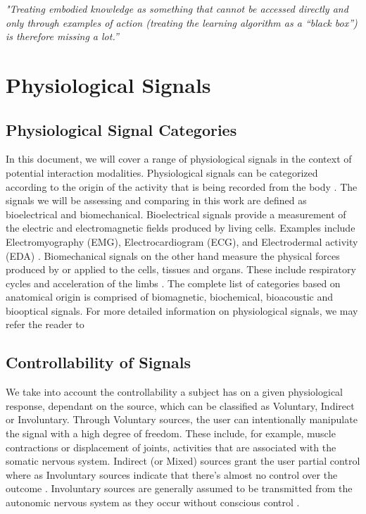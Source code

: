 \textit{"Treating embodied knowledge as something that cannot be accessed directly and only through examples of action (treating the learning algorithm as a “black box”) is therefore missing a lot.” }

\citeauthor{gillies_understanding_2019} \cite{gillies_understanding_2019}


\section{Physiological Signals}

\subsection{Physiological Signal Categories}
\label{subsec:catagories}

In this document, we will cover a range of physiological signals in the context of potential interaction modalities. Physiological signals can be categorized according to the origin of the activity that is being recorded from the body \cite{enderle_introduction_2012}. The signals we will be assessing and comparing in this work are defined as bioelectrical and biomechanical. Bioelectrical signals provide a measurement of the electric and electromagnetic fields produced by living cells. Examples include Electromyography (EMG), Electrocardiogram (ECG), and Electrodermal activity (EDA) \cite{malmivuo_bioelectromagnetismprinciples_1995}. Biomechanical signals on the other hand measure the physical forces produced by or applied to the cells, tissues and organs. These include respiratory cycles and acceleration of the limbs \cite{guerreiro_bitalino_2013, pacelli_sensing_2006}. The complete list of categories based on anatomical origin is comprised of biomagnetic, biochemical, bioacoustic and biooptical signals. For more detailed information on physiological signals, we may refer the reader to \cite{webb_principles_2018}

\subsection{Controllability of Signals}

We take into account the controllability a subject has on a given physiological response, dependant on the source, which can be classified as Voluntary, Indirect or Involuntary. Through Voluntary sources, the user can intentionally manipulate the signal with a high degree of freedom. These include, for example, muscle contractions or displacement of joints, activities that are associated with the somatic nervous system. Indirect (or Mixed) sources grant the user partial control where as Involuntary sources indicate that there's almost no control over the outcome \cite{da_silva_biosignal_2017}. Involuntary sources are generally assumed to be transmitted from the autonomic nervous system as they occur without conscious control \cite{lenman_human_1975}.

